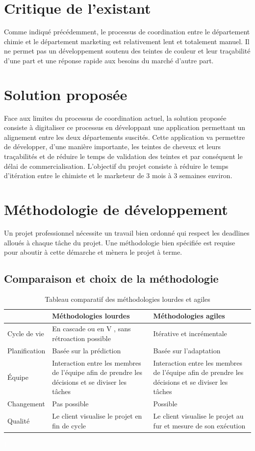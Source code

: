 \section{Critique de l’existant}
Comme indiqué précédemment, le processus de coordination entre le département chimie et le département marketing est relativement lent et totalement manuel. Il ne permet pas un développement soutenu des teintes de couleur et leur traçabilité d’une part et une réponse rapide aux besoins du marché d’autre part.

\section{Solution proposée}
Face aux limites du processus de coordination actuel, la solution proposée consiste à digitaliser ce processus en développant une application permettant un alignement entre les deux départements suscités. Cette application va permettre de développer, d’une manière importante, les teintes de cheveux et leurs traçabilités et de réduire le temps de validation des teintes et par conséquent le délai de commercialisation.
L’objectif du projet consiste à réduire le temps d’itération entre le chimiste et le marketeur de 3 mois à 3 semaines environ.

\section{Méthodologie de développement}
Un projet professionnel nécessite un travail bien ordonné qui respect les deadlines alloués à chaque tâche du projet. Une méthodologie bien spécifiée est requise pour aboutir à cette démarche et mènera le projet à terme. 

\subsection{Comparaison et choix de la méthodologie}

\begin{table}[h!]
\center
\begin{tabular}[b]{|m{5cm}|m{5cm}|m{5cm}|}
\hline
\rowcolor{white}
 & Méthodologies lourdes  & Méthodologies agiles \\
\hline
Cycle de vie & En cascade ou en V , sans rétroaction possible & Itérative et incrémentale \\
\hline
Planification & Basée sur la prédiction & Basée sur l’adaptation \\
\hline
Équipe & Interaction entre les membres de l’équipe afin de prendre les décisions et se diviser les tâches & Interaction entre les membres de l’équipe afin de prendre les décisions et se diviser les tâches \\
\hline
Changement & Pas possible & Possible \\
\hline
Qualité & Le client visualise le projet en fin de cycle & Le client visualise le projet au fur et mesure de son exécution \\
\hline
\end{tabular}
\caption{Tableau comparatif des méthodologies lourdes et agiles}
\textcolor{white}{I} \label{tab:tab-m}
\end{table}


